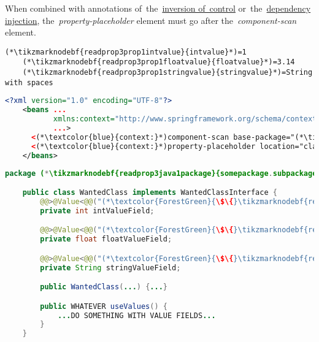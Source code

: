 \warning When combined with annotations of~the~\hyperref[iocannotations]{inversion of~control} or~the~\hyperref[autowiring]{dependency injection}, the~\textit{property-placeholder} element must go after the~\textit{component-scan} element.

\enlargethispage{20mm}
\thispagestyle{empty}
\example
\begin{lstlisting}[title={A \mboxtextit{.properties} file called \tikzmarknodebf{readprop3prop1filename}{\textit{annotations.properties}}}]
    (*\tikzmarknodebf{readprop3prop1intvalue}{intvalue}*)=1
    (*\tikzmarknodebf{readprop3prop1floatvalue}{floatvalue}*)=3.14
    (*\tikzmarknodebf{readprop3prop1stringvalue}{stringvalue}*)=String with spaces
\end{lstlisting}
\begin{lstlisting}[language=XML, title={Configuration XML}]
    <?xml version="1.0" encoding="UTF-8"?>
    <beans ...
           xmlns:context="http://www.springframework.org/schema/context"
           ...>
      <(*\textcolor{blue}{context:}*)component-scan base-package="(*\tikzmarknodebf{readprop3xml1package}{somepackage.subpackage}[ForestGreen]*)"/>
      <(*\textcolor{blue}{context:}*)property-placeholder location="classpath:(*\tikzmarknodebf{readprop3xml1filename}{annotations.properties}[ForestGreen]*)" file-encoding="utf-8"/>
    </beans>
\end{lstlisting}
\begin{lstlisting}[language=Java, title={Wanted class with any constructor}]
    package (*\tikzmarknodebf{readprop3java1package}{somepackage.subpackage}*);

    public class WantedClass implements WantedClassInterface {
        @@>@Value<@@("(*\textcolor{ForestGreen}{\$\{}\tikzmarknodebf{readprop3java1intvalue}{intvalue}[ForestGreen]\textcolor{ForestGreen}{\}}*)")
        private int intValueField;

        @@>@Value<@@("(*\textcolor{ForestGreen}{\$\{}\tikzmarknodebf{readprop3java1floatvalue}{floatvalue}[ForestGreen]\textcolor{ForestGreen}{\}}*)")
        private float floatValueField;

        @@>@Value<@@("(*\textcolor{ForestGreen}{\$\{}\tikzmarknodebf{readprop3java1stringvalue}{stringvalue}[ForestGreen]\textcolor{ForestGreen}{\}}*)")
        private String stringValueField;

        public WantedClass(...) {...}

        public WHATEVER useValues() {
            ...DO SOMETHING WITH VALUE FIELDS...
        }
    }
\end{lstlisting}
\newpage


